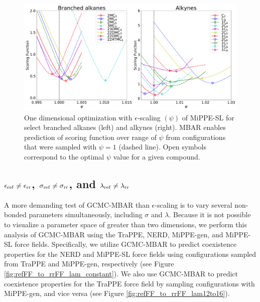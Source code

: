 \documentclass[journal=jced,manuscript=article]{achemso}
\begin{document}
	\begin{figure}[htb!]
		\centering
		\includegraphics[width=6.4in]{Optimal_epsilon_scaling.pdf}
		\caption{One dimensional optimization with $\epsilon$-scaling $(\psi)$ of MiPPE-SL for select branched alkanes (left) and alkynes (right). MBAR enables prediction of scoring function over range of $\psi$ from configurations that were sampled with $\psi = 1$ (dashed line). Open symbols correspond to the optimal $\psi$ value for a given compound.}
		\label{fig:epsilon_scaling}
	\end{figure}

 

\subsection{$\epsilon_{\rm ref} \neq \epsilon_{\rm rr}$, $\sigma_{\rm ref} \neq \sigma_{\rm rr}$, and $\lambda_{\rm ref} \neq \lambda_{\rm rr}$} \label{sec: litFF}

A more demanding test of GCMC-MBAR than $\epsilon$-scaling is to vary several non-bonded parameters simultaneously, including $\sigma$ and $\lambda$. Because it is not possible to visualize a parameter space of greater than two dimensions, we perform this analysis of GCMC-MBAR using the TraPPE, NERD, MiPPE-gen, and MiPPE-SL force fields. Specifically, we utilize GCMC-MBAR to predict coexistence properties for the NERD and MiPPE-SL force fields using configurations sampled from TraPPE and MiPPE-gen, respectively (see Figure \ref{fig:refFF_to_rrFF_lam_constant}). We also use GCMC-MBAR to predict coexistence properties for the TraPPE force field by sampling configurations with MiPPE-gen, and vice versa (see Figure \ref{fig:refFF_to_rrFF_lam12to16}). 
\end{document}
